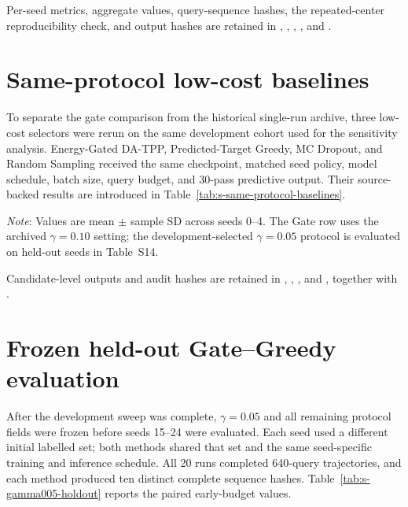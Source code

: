 \documentclass[cmc,article,submit,moreauthors,pdftex]{Definitions/tsp}
\newcommand{\tabnote}[1]{\par\smallskip\noindent\begin{minipage}{\linewidth}\footnotesize\emph{Note}: #1\end{minipage}\par}
\begin{document}
Per-seed metrics, aggregate values, query-sequence hashes, the repeated-center
reproducibility check, and output hashes are retained in
,
,
,
, and
.

\section{Same-protocol low-cost baselines}

To separate the gate comparison from the historical single-run archive, three
low-cost selectors were rerun on the same development cohort used for the
sensitivity analysis. Energy-Gated DA-TPP, Predicted-Target Greedy, MC Dropout,
and Random Sampling received the same checkpoint, matched seed policy, model
schedule, batch size, query budget, and 30-pass predictive output. Their
source-backed results are introduced in Table~\ref{tab:s-same-protocol-baselines}.

\begin{table}[H]
\centering
\caption{Same-protocol development-cohort comparison with low-cost baselines.}
\label{tab:s-same-protocol-baselines}
\tablesize{\scriptsize}
\resizebox{\textwidth}{!}{}
\tabnote{Values are mean $\pm$ sample SD across seeds 0--4. The Gate row uses
the archived $\gamma=0.10$ setting; the development-selected $\gamma=0.05$
protocol is evaluated on held-out seeds in Table~S14.}
\end{table}

Candidate-level outputs and audit hashes are retained in
,
,
, and
, together with
.

\section{Frozen held-out Gate--Greedy evaluation}

After the development sweep was complete, $\gamma=0.05$ and all remaining
protocol fields were frozen before seeds 15--24 were evaluated. Each seed used a
different initial labelled set; both methods shared that set and the same
seed-specific training and inference schedule. All 20 runs completed 640-query
trajectories, and each method produced ten distinct complete sequence hashes.
Table~\ref{tab:s-gamma005-holdout} reports the paired early-budget values.
\end{document}

